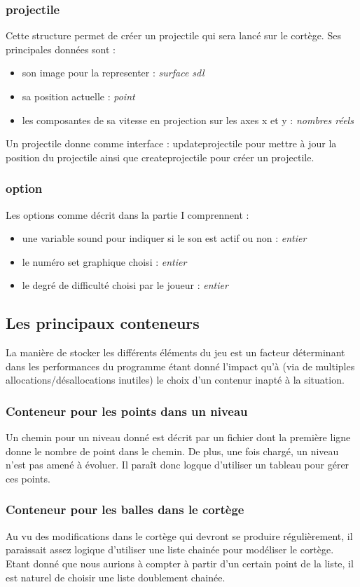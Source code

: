 \subsubsection{projectile}
Cette structure permet de créer un projectile qui sera lancé sur le
cortège. Ses principales données sont : 
\begin{itemize}
  \item son image pour la representer : \textit{surface sdl}
  \item sa position actuelle : \textit{point}
  \item les composantes de sa vitesse en projection sur les axes x et
    y : \textit{nombres réels}
\end{itemize}

Un projectile donne comme interface : update\textunderscore projectile
pour mettre à jour la position du projectile ainsi que
create\textunderscore projectile pour créer un projectile.

\subsubsection{option}
Les options comme décrit dans la partie I comprennent : 
\begin{itemize}
  \item une variable sound pour indiquer si le son est actif ou non : \textit{entier}
  \item le numéro set graphique choisi : \textit{entier}
  \item le degré de difficulté choisi par le joueur : \textit{entier}
\end{itemize}

\subsection{Les principaux conteneurs}
La manière de stocker les différents éléments du jeu est un facteur
déterminant dans les performances du programme étant donné l'impact
qu'à (via de multiples allocations/désallocations inutiles) le choix
d'un contenur inapté à la situation.

\subsubsection{Conteneur pour les points dans un niveau}
Un chemin pour un niveau donné est décrit par un fichier dont la
première ligne donne le nombre de point dans le chemin. De plus, une
fois chargé, un niveau n'est pas amené à évoluer. Il paraît donc
logque d'utiliser un tableau pour gérer ces points.

\subsubsection{Conteneur pour les balles dans le cortège}
Au vu des modifications dans le cortège qui devront se produire
régulièrement, il paraissait assez logique d'utiliser une liste
chainée pour modéliser le cortège. Etant donné que nous aurions à
compter à partir d'un certain point de la liste, il est naturel de
choisir une liste doublement chainée.


